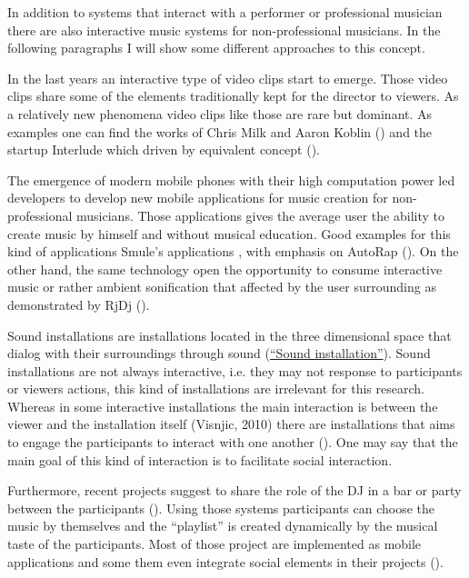In addition to systems that interact with a performer or professional musician there are also interactive music systems for non-professional musicians. In the following paragraphs I will show some different approaches to this concept.

In the last years an interactive type of video clips start to emerge. Those video clips share some of the elements traditionally kept for the director to viewers. As a relatively new phenomena video clips like those are rare but dominant. As examples one can find the works of Chris Milk and Aaron Koblin () and the startup Interlude which driven by equivalent concept ().

The emergence of modern mobile phones with their high computation power led developers to develop new mobile applications for music creation for non-professional musicians. Those applications gives the average user the ability to create music by himself and without musical education. Good examples for this kind of applications Smule's applications , with emphasis on AutoRap (). On the other hand, the same technology open the opportunity to consume interactive music or rather ambient sonification that affected by the user surrounding as demonstrated by RjDj ().

Sound installations are installations located in the three dimensional space that dialog with their surroundings through sound (\href{http://en.wikipedia.org/wiki/Sound_installation}{``Sound installation''}). Sound installations are not always interactive, i.e. they may not response to participants or viewers actions, this kind of installations are irrelevant for this research. Whereas in some interactive installations the main interaction is between the viewer and the installation itself (Visnjic, 2010) there are installations that aims to engage the participants to interact with one another (). One may say that the main goal of this kind of interaction is to facilitate social interaction.

Furthermore, recent projects suggest to share the role of the DJ in a bar or party between the participants (). Using those systems participants can choose the music by themselves and the ``playlist'' is created dynamically by the musical taste of the participants. Most of those project are implemented as mobile applications and some them even integrate social elements in their projects ().

